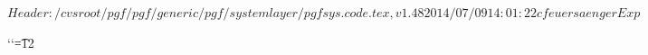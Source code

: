 %
%
%

\ProvidesPackageRCS[v\pgfversion] $Header: /cvsroot/pgf/pgf/generic/pgf/systemlayer/pgfsys.code.tex,v 1.48 2014/07/09 14:01:22 cfeuersaenger Exp $




\def\pgfset{\pgfqkeys{/pgf}}

\newif\ifpgfpicture


%
% 
{\catcode`\catcode`\t=12\gdef\Pgf@geT#1pt{#1}}

\def\pgf@sys@tonumber#1{\expandafter\Pgf@geT\the#1}

\def\pgf@sys@bp@correct#1{#1=0.99627#1}

\def\pgf@sys@bp#1{%
  {%
    \pgf@x=#1\relax%
    \pgf@x=0.99627\pgf@x%
    \edef\temp{\expandafter\Pgf@geT\the\pgf@x\space}%
    \pgfutil@toks@\expandafter\expandafter\expandafter{\expandafter\pgfsysprotocol@currentprotocol\temp}%
    \xdef\pgfsysprotocol@currentprotocol{\the\pgfutil@toks@}%
  }%
}
\def\pgf@sys@pt#1{%
  {%
    \pgf@x=#1\relax%
    \edef\temp{\expandafter\Pgf@geT\the\pgf@x\space}%
    \pgfutil@toks@\expandafter\expandafter\expandafter{\expandafter\pgfsysprotocol@currentprotocol\temp}%
    \xdef\pgfsysprotocol@currentprotocol{\the\pgfutil@toks@}%
  }%
}


\newdimen\pgf@x
\newdimen\pgf@y
\newdimen\pgf@xa
\newdimen\pgf@ya
\newdimen\pgf@xb
\newdimen\pgf@yb
\newdimen\pgf@xc
\newdimen\pgf@yc

\newwrite\w@pgf@writea
\newread\r@pgf@reada
\let\pgfutil@inputcheck=\r@pgf@reada

\newcount\c@pgf@counta
\newcount\c@pgf@countb
\newcount\c@pgf@countc
\newcount\c@pgf@countd

\newtoks\t@pgf@toka
\newtoks\t@pgf@tokb
\newtoks\t@pgf@tokc

\let\pgfmath@x\pgf@x
\let\pgfmath@xa\pgf@xa
\let\pgfmath@xb\pgf@xb
\let\pgfmath@xc\pgf@xc

